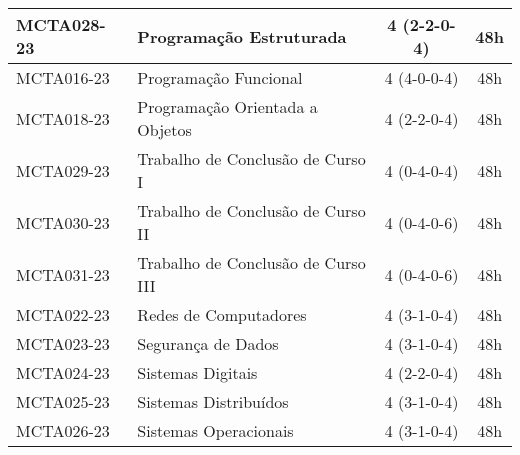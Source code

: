 \begin{table}[!h]
\begin{longtable}{|l|p{}|c|c|}
        \hline
        MCTA028-23 & Programação Estruturada & 4 (2-2-0-4) & 48h \\
        \hline
        MCTA016-23 & Programação Funcional & 4 (4-0-0-4) & 48h \\
        \hline
        MCTA018-23 & Programação Orientada a Objetos & 4 (2-2-0-4) & 48h \\
        \hline
        MCTA029-23 & Trabalho de Conclusão de Curso I & 4 (0-4-0-4) & 48h \\
        \hline
        MCTA030-23 & Trabalho de Conclusão de Curso II & 4 (0-4-0-6) & 48h \\
        \hline
        MCTA031-23 & Trabalho de Conclusão de Curso III & 4 (0-4-0-6) & 48h \\
        \hline
        MCTA022-23 & Redes de Computadores & 4 (3-1-0-4) & 48h \\
        \hline
        MCTA023-23 & Segurança de Dados & 4 (3-1-0-4) & 48h \\
        \hline
        MCTA024-23 & Sistemas Digitais & 4 (2-2-0-4) & 48h \\
        \hline
        MCTA025-23 & Sistemas Distribuídos & 4 (3-1-0-4) & 48h \\
        \hline
        MCTA026-23 & Sistemas Operacionais & 4 (3-1-0-4) & 48h\\
        \hline
    \end{longtable}
\end{table}
